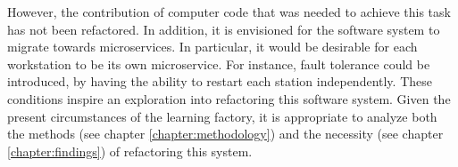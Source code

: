 However, the contribution of computer code that was needed to achieve this task has not been refactored. In addition, it is envisioned for the software system to migrate towards microservices. In particular, it would be desirable for each workstation to be its own microservice. For instance, fault tolerance could be introduced, by having the ability to restart each station independently.  These conditions inspire an exploration into refactoring this software system. Given the present circumstances of the learning factory, it is appropriate to analyze both the methods (see chapter \ref{chapter:methodology}) and the necessity (see chapter \ref{chapter:findings}) of refactoring this system. 